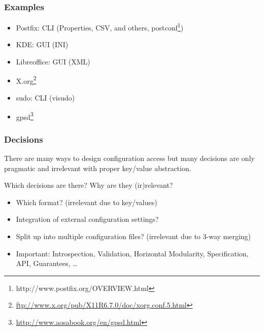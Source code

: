 \begin{frame}
	\frametitle{Examples}

	\begin{itemize}
	\item Postfix: CLI (Properties, CSV, and others, postconf\footnote{http://www.postfix.org/OVERVIEW.html})
	\item KDE: GUI (INI)
	\item Libreoffice: GUI (XML)
	\item X.org\footnote{\url{ftp://www.x.org/pub/X11R6.7.0/doc/xorg.conf.5.html}}
	\item sudo: CLI (visudo)
	\item gpsd\footnote{\url{http://www.aosabook.org/en/gpsd.html}}
	\end{itemize}
\end{frame}

\begin{frame}
	\frametitle{Decisions}

	There are many ways to design configuration access but many decisions are only pragmatic and irrelevant with proper key/value abstraction.

	\begin{task}
	Which decisions are there?
	Why are they (ir)relevant?
	\end{task}

	\pause

	\begin{itemize}
	\item Which format? (irrelevant due to key/values)
	\item Integration of external configuration settings?
	\item Split up into multiple configuration files? (irrelevant due to 3-way merging)
	\item Important: Introspection, Validation, Horizontal Modularity,
		Specification, API, Guarantees, \dots
	\end{itemize}
\end{frame}

